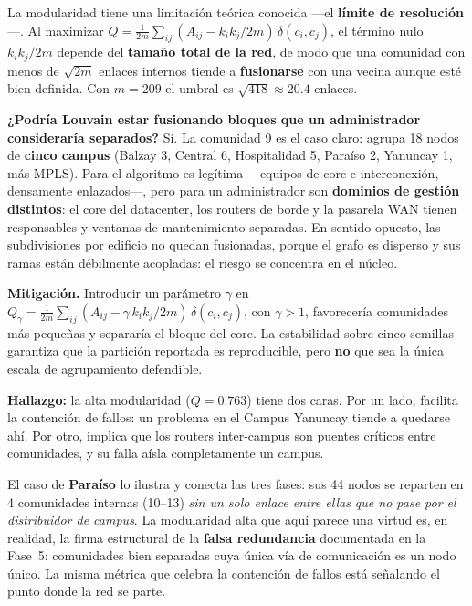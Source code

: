 \documentclass[11pt, a4paper]{article}
\newenvironment{hallazgo}{%
    \begin{mdframed}[backgroundcolor=verdeFondo, linecolor=verde,
        linewidth=2pt, leftline=true, rightline=false,
        topline=false, bottomline=false,
        innerleftmargin=10pt, innerrightmargin=10pt,
        innertopmargin=6pt, innerbottommargin=6pt,
        skipabove=6pt, skipbelow=6pt]
    \small
}{\end{mdframed}}
\begin{document}
La modularidad tiene una limitación teórica conocida —el \textbf{límite de
resolución} \cite{fortunato2007}—. Al maximizar
$Q = \frac{1}{2m}\sum_{ij}(A_{ij} - k_ik_j/2m)\,\delta(c_i,c_j)$, el término
nulo $k_ik_j/2m$ depende del \textbf{tamaño total de la red}, de modo que
una comunidad con menos de $\sqrt{2m}$ enlaces internos tiende a
\textbf{fusionarse} con una vecina aunque esté bien definida. Con $m=209$
el umbral es $\sqrt{418}\approx 20.4$ enlaces.

\textbf{¿Podría Louvain estar fusionando bloques que un administrador
consideraría separados?} Sí. La comunidad 9 es el caso claro: agrupa 18
nodos de \textbf{cinco campus} (Balzay 3, Central 6, Hospitalidad 5,
Paraíso 2, Yanuncay 1, más MPLS). Para el algoritmo es legítima —equipos de
core e interconexión, densamente enlazados—, pero para un administrador son
\textbf{dominios de gestión distintos}: el core del datacenter, los routers
de borde y la pasarela WAN tienen responsables y ventanas de mantenimiento
separadas. En sentido opuesto, las subdivisiones por edificio no quedan
fusionadas, porque el grafo es disperso y sus ramas están débilmente
acopladas: el riesgo se concentra en el núcleo.

\textbf{Mitigación.} Introducir un parámetro $\gamma$ en
$Q_\gamma = \frac{1}{2m}\sum_{ij}(A_{ij} - \gamma\,k_ik_j/2m)\,
\delta(c_i,c_j)$, con $\gamma>1$, favorecería comunidades más pequeñas y
separaría el bloque del core. La estabilidad sobre cinco semillas garantiza
que la partición reportada es reproducible, pero \textbf{no} que sea la
única escala de agrupamiento defendible.

\begin{hallazgo}
\textbf{Hallazgo:} la alta modularidad ($Q=0.763$) tiene dos caras. Por un
lado, facilita la contención de fallos: un problema en el Campus Yanuncay
tiende a quedarse ahí. Por otro, implica que los routers inter-campus son
puentes críticos entre comunidades, y su falla aísla completamente un campus.

El caso de \textbf{Paraíso} lo ilustra y conecta las tres fases: sus 44
nodos se reparten en 4 comunidades internas (10--13) \textit{sin un solo
enlace entre ellas que no pase por el distribuidor de campus}. La
modularidad alta que aquí parece una virtud es, en realidad, la firma
estructural de la \textbf{falsa redundancia} documentada en la Fase~5:
comunidades bien separadas cuya única vía de comunicación es un nodo
único. La misma métrica que celebra la contención de fallos está
señalando el punto donde la red se parte.
\end{hallazgo}
\end{document}
